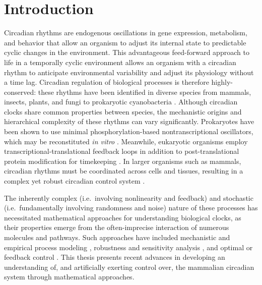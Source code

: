\chapter{Introduction}

Circadian rhythms are endogenous oscillations in gene expression, metabolism, and behavior that allow an organism to adjust its internal state to predictable cyclic changes in the environment.
This advantageous feed-forward approach to life in a temporally cyclic environment allows an organism with a circadian rhythm to anticipate environmental variability and adjust its physiology without a time lag.
Circadian regulation of biological processes is therefore highly-conserved: these rhythms have been identified in diverse species from mammals, insects, plants, and fungi to prokaryotic cyanobacteria \cite{Reppert2002, Hardin2005, Harmer2000, Dunlap2004a}.
Although circadian clocks share common properties between species, the mechanistic origins and hierarchical complexity of these rhythms can vary significantly.
Prokaryotes have been shown to use minimal phosphorylation-based nontranscriptional oscillators, which may be reconstituted \textit{in vitro} \cite{Ishiura1998, Nakajima2005}.
Meanwhile, eukaryotic organisms employ transcriptional-translational feedback loops in addition to post-translational protein modification for timekeeping \cite{Dunlap1999, ONeill2011}.
In larger organisms such as mammals, circadian rhythms must be coordinated across cells and tissues, resulting in a complex yet robust circadian control system \cite{Welsh2010, Doyle2006}.

The inherently complex (i.e.\ involving nonlinearity and feedback) and stochastic (i.e.\ fundamentally involving randomness and noise) nature of these processes has necessitated mathematical approaches for understanding biological clocks, as their properties emerge from the often-imprecise interaction of numerous molecules and pathways.
Such approaches have included mechanistic and empirical process modeling \cite{Kronauer1999, Jewett1999, Leloup2003a, Gonze2003, Forger2005, To2007, Mirsky2009b,  Ko2010, Hirota2012a}, robustness and sensitivity analysis \cite{Leloup2003a, Gonze2006, Rougemont2007, Taylor2008a, Tidor2009, StJohn2013, Taylor2014a}, and optimal or feedback control \cite{Doyle2006, Bagheri2008, Bagheri2008a, Serkh2014, Zhang2016}.
This thesis presents recent advances in developing an understanding of, and artificially exerting control over, the mammalian circadian system through mathematical approaches.


